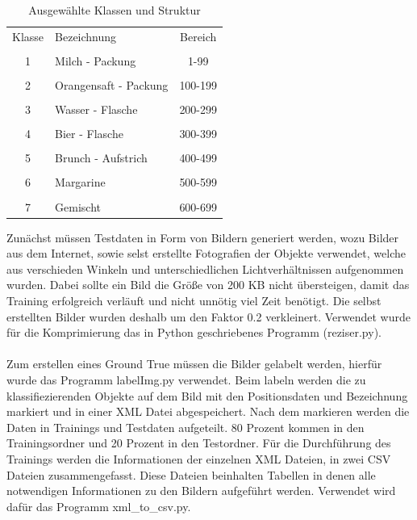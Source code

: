 \documentclass[a4paper,12pt,oneside]{article}
\begin{document}
\begin{table}
[h]
\centering
\caption{Ausgewählte Klassen und Struktur}
\label{klassen2}
\begin{tabular}{|c|l|c|}
  
    Klasse   &   Bezeichnung   &   Bereich   \\
  & & \\
    1   &   Milch - Packung   &   1-99   \\
  & & \\
    2   &   Orangensaft - Packung   &   100-199   \\
  & & \\
    3   &   Wasser - Flasche   &   200-299   \\
  & & \\
    4   &   Bier - Flasche   &   300-399   \\
  & & \\
    5   &   Brunch - Aufstrich   &   400-499   \\
  & & \\
    6   &   Margarine   &   500-599   \\
  & & \\
    7   &   Gemischt   &   600-699
  
\end{tabular}
\end{table}

\vspace{1 cm}

Zunächst müssen Testdaten in Form von Bildern generiert werden, wozu Bilder aus dem Internet, sowie selst erstellte Fotografien der Objekte verwendet, welche aus  verschieden Winkeln und unterschiedlichen Lichtverhältnissen aufgenommen wurden. Dabei sollte ein Bild die Größe von 200 KB nicht übersteigen, damit das Training erfolgreich verläuft und nicht unnötig viel Zeit benötigt. Die selbst erstellten Bilder wurden deshalb um den Faktor 0.2 verkleinert. Verwendet wurde für die Komprimierung das in Python geschriebenes Programm (reziser.py).\\
\\
Zum erstellen eines Ground True müssen die Bilder gelabelt werden, hierfür wurde das Programm labelImg.py verwendet. Beim labeln werden die zu klassifiezierenden Objekte auf dem Bild mit den Positionsdaten und Bezeichnung markiert und in einer XML Datei abgespeichert. Nach dem markieren werden die Daten in Trainings und Testdaten aufgeteilt. 80 Prozent kommen in den Trainingsordner und 20 Prozent in den Testordner. Für die Durchführung des Trainings werden die Informationen der einzelnen XML Dateien, in zwei CSV Dateien zusammengefasst. Diese Dateien beinhalten Tabellen in denen alle notwendigen Informationen zu den Bildern aufgeführt werden. Verwendet wird dafür das Programm xml\_to\_csv.py.\\
\\
\end{document}
